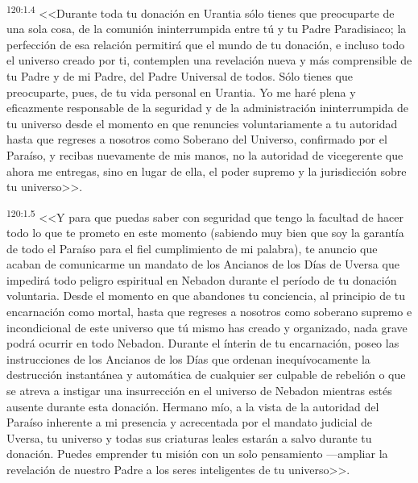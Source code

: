 \par 
\textsuperscript{120:1.4} <<Durante toda tu donación en Urantia sólo tienes que preocuparte de una sola cosa, de la comunión ininterrumpida entre tú y tu Padre Paradisiaco; la perfección de esa relación permitirá que el mundo de tu donación, e incluso todo el universo creado por ti, contemplen una revelación nueva y más comprensible de tu Padre y de mi Padre, del Padre Universal de todos. Sólo tienes que preocuparte, pues, de tu vida personal en Urantia. Yo me haré plena y eficazmente responsable de la seguridad y de la administración ininterrumpida de tu universo desde el momento en que renuncies voluntariamente a tu autoridad hasta que regreses a nosotros como Soberano del Universo, confirmado por el Paraíso, y recibas nuevamente de mis manos, no la autoridad de vicegerente que ahora me entregas, sino en lugar de ella, el poder supremo y la jurisdicción sobre tu universo>>.

\par 
\textsuperscript{120:1.5} <<Y para que puedas saber con seguridad que tengo la facultad de hacer todo lo que te prometo en este momento (sabiendo muy bien que soy la garantía de todo el Paraíso para el fiel cumplimiento de mi palabra), te anuncio que acaban de comunicarme un mandato de los Ancianos de los Días de Uversa que impedirá todo peligro espiritual en Nebadon durante el período de tu donación voluntaria. Desde el momento en que abandones tu conciencia, al principio de tu encarnación como mortal, hasta que regreses a nosotros como soberano supremo e incondicional de este universo que tú mismo has creado y organizado, nada grave podrá ocurrir en todo Nebadon. Durante el ínterin de tu encarnación, poseo las instrucciones de los Ancianos de los Días que ordenan inequívocamente la destrucción instantánea y automática de cualquier ser culpable de rebelión o que se atreva a instigar una insurrección en el universo de Nebadon mientras estés ausente durante esta donación. Hermano mío, a la vista de la autoridad del Paraíso inherente a mi presencia y acrecentada por el mandato judicial de Uversa, tu universo y todas sus criaturas leales estarán a salvo durante tu donación. Puedes emprender tu misión con un solo pensamiento ---ampliar la revelación de nuestro Padre a los seres inteligentes de tu universo>>.


